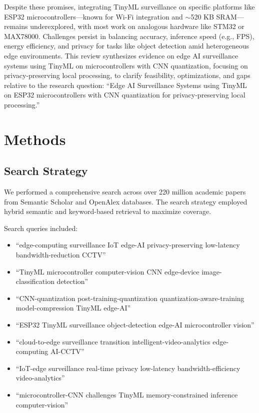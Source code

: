 \documentclass[12pt, a4paper]{article}
\begin{document}
Despite these promises, integrating TinyML surveillance on specific platforms like ESP32 microcontrollers---known for Wi-Fi integration and $\sim$520 KB SRAM---remains underexplored, with most work on analogous hardware like STM32 or MAX78000. Challenges persist in balancing accuracy, inference speed (e.g., FPS), energy efficiency, and privacy for tasks like object detection amid heterogeneous edge environments. This review synthesizes evidence on edge AI surveillance systems using TinyML on microcontrollers with CNN quantization, focusing on privacy-preserving local processing, to clarify feasibility, optimizations, and gaps relative to the research question: ``Edge AI Surveillance Systems using TinyML on ESP32 microcontrollers with CNN quantization for privacy-preserving local processing.''

\section{Methods}
\subsection{Search Strategy}
We performed a comprehensive search across over 220 million academic papers from Semantic Scholar and OpenAlex databases. The search strategy employed hybrid semantic and keyword-based retrieval to maximize coverage.

Search queries included:
\begin{itemize}
    \item ``edge-computing surveillance IoT edge-AI privacy-preserving low-latency bandwidth-reduction CCTV''
    \item ``TinyML microcontroller computer-vision CNN edge-device image-classification detection''
    \item ``CNN-quantization post-training-quantization quantization-aware-training model-compression TinyML edge-AI''
    \item ``ESP32 TinyML surveillance object-detection edge-AI microcontroller vision''
    \item ``cloud-to-edge surveillance transition intelligent-video-analytics edge-computing AI-CCTV''
    \item ``IoT-edge surveillance real-time privacy low-latency bandwidth-efficiency video-analytics''
    \item ``microcontroller-CNN challenges TinyML memory-constrained inference computer-vision''
\end{itemize}
\end{document}
